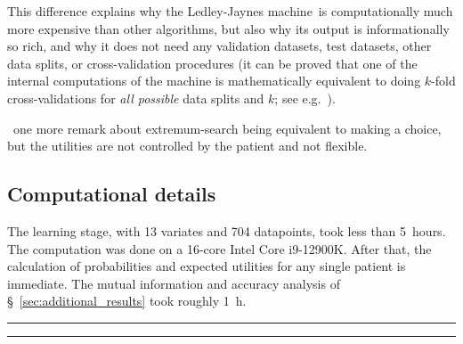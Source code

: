 \documentclass[utf8]{FrontiersinHarvard} %
\newcommand*{\pencil}{{\fontencoding{U}\fontfamily{fontawesometwo}\selectfont\symbol{210}}}
\newcommand{\mynotep}[1]{{\color{notecolour}\pencil\ #1}}
\newcommand*{\sect}{\S}%
\newcommand*{\eg}{{e.g.}}
\renewcommand*{\|}[1][]{\nonscript\:#1\vert\nonscript\:\mathopen{}}
\newcommand*{\ljm}{Ledley-Jaynes machine}
\begin{document}
This difference explains why the \ljm\ is computationally much more expensive than other algorithms, but also why its output is informationally so rich, and why it does not need any validation datasets, test datasets, other data splits, or cross-validation procedures (it can be proved that one of the internal computations of the machine is mathematically equivalent to doing $k$-fold cross-validations for \emph{all possible} data splits and $k$; see \eg\ \citealt{portamana2019b,fongetal2020}).

\mynotep{one more remark about extremum-search being equivalent to making a choice, but the utilities are not controlled by the patient and not flexible.}


\subsection{Computational details}
\label{sec:comput_details}

The learning stage, with 13 variates and 704 datapoints, took less than 5~hours. The computation was done on a 16-core Intel Core i9-12900K. After that, the calculation of probabilities and expected utilities for any single patient is immediate. The mutual information and accuracy analysis of \sect~\ref{sec:additional_results} took roughly 1~h.














\newpage
\hrule
\hrule



\end{document}
